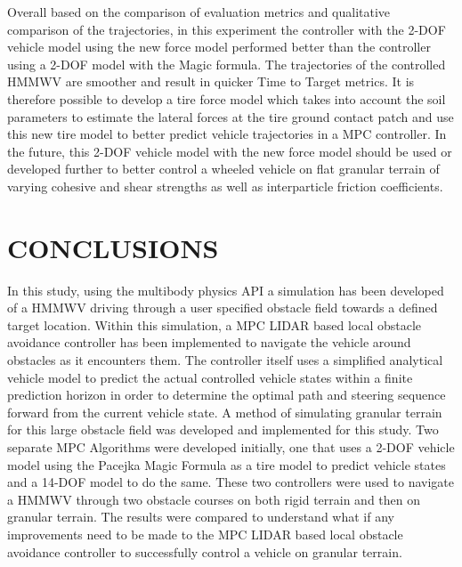 \documentclass[12pt,onecolumn]{report}
\newcommand{\CHRONO}{{\sffamily{{Chrono}}}}
\begin{document}
Overall based on the comparison of evaluation metrics and qualitative comparison of the trajectories, in this experiment the controller with the 2-DOF vehicle model using the new force model performed better than the controller using a 2-DOF model with the Magic formula. The trajectories of the controlled HMMWV are smoother and result in quicker Time to Target metrics. It is therefore possible to develop a tire force model which takes into account the soil parameters to estimate the lateral forces at the tire ground contact patch and use this new tire model to better predict vehicle trajectories in a MPC controller. In the future, this 2-DOF vehicle model with the new force model should be used or developed further to better control a wheeled vehicle on flat granular terrain of varying cohesive and shear strengths as well as interparticle friction coefficients. 


\chapter{CONCLUSIONS}\label{c:conclusion}

In this study, using the multibody physics API {\CHRONO} a simulation has been developed of a HMMWV driving through a user specified obstacle field towards a defined target location. Within this simulation, a MPC LIDAR based local obstacle avoidance controller has been implemented to navigate the vehicle around obstacles as it encounters them. The controller itself uses a simplified analytical vehicle model to predict the actual controlled {\CHRONO} vehicle states within a finite prediction horizon in order to determine the optimal path and steering sequence forward from the current vehicle state. A method of simulating granular terrain for this large obstacle field was developed and implemented for this study. Two separate MPC Algorithms were developed initially, one that uses a 2-DOF vehicle model using the Pacejka Magic Formula as a tire model to predict {\CHRONO} vehicle states and a 14-DOF model to do the same. These two controllers were used to navigate a {\CHRONO} HMMWV through two obstacle courses on both rigid terrain and then on granular terrain. The results were compared to understand what if any improvements need to be made to the MPC LIDAR based local obstacle avoidance controller to successfully control a vehicle on granular terrain. 
\end{document}
